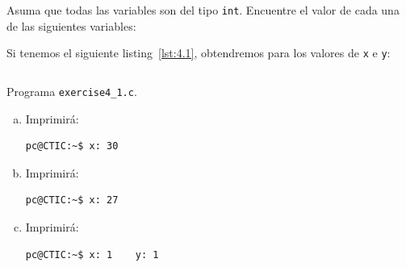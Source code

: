 \documentclass[spanish,addpoints,answers,a4paper]{exam}
\begin{document}
\begin{questions}

\question Asuma que todas las variables son del tipo \texttt{int}. Encuentre el valor de cada una de las siguientes variables:


\begin{solution}
Si tenemos el siguiente listing~\ref{lst:4.1}, obtendremos para los valores de \texttt{x} e \texttt{y}:

\begin{listing}[H]
	\footnotesize
	\inputminted{c}{exercise4_1.c}
	\caption{Programa \texttt{exercise4\_1.c}.}
	\label{lst:4.1}
\end{listing}


\begin{multicols}{2}
\begin{enumerate}[(a)]

\item Imprimirá:

\begin{verbatim}
pc@CTIC:~$ x: 30
\end{verbatim}

\item Imprimirá:

\begin{verbatim}
pc@CTIC:~$ x: 27
\end{verbatim}

\item Imprimirá:

\begin{verbatim}
pc@CTIC:~$ x: 1    y: 1
\end{verbatim}


\end{enumerate}
\end{multicols}
\end{solution}
\end{questions}
\end{document}
